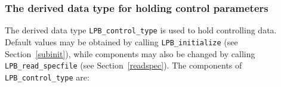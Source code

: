 \documentclass{galahad}
\newcommand{\packagename}{LPB}
\begin{document}

\subsubsection{The derived data type for holding control
 parameters}\label{typecontrol}
The derived data type
{\tt \packagename\_control\_type}
is used to hold controlling data. Default values may be obtained by calling
{\tt \packagename\_initialize}
(see Section~\ref{subinit}),
while components may also be changed by calling
{\tt \packagename\_read\-\_specfile}
(see Section~\ref{readspec}).
The components of
{\tt \packagename\_control\_type}
are:



\end{document}

